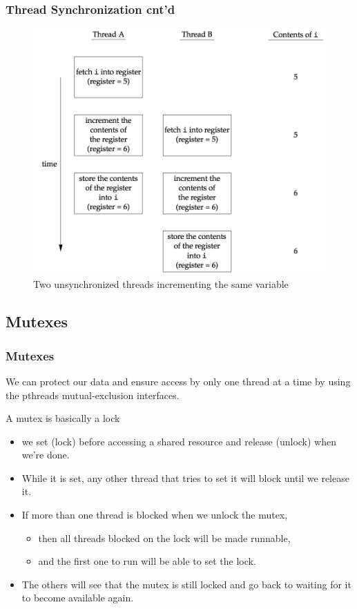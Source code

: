 \documentclass[newPxFont,sthlmFooter,nooffset]{beamer}
\begin{document}
\begin{frame}[t]
  \frametitle{Thread Synchronization cnt'd}

  \begin{figure}[h]
    \centering
    \includegraphics[width=0.7\linewidth]{figure/fig11-9}
    \caption{Two unsynchronized threads incrementing the same variable}
    \label{fig:work}
  \end{figure}


\end{frame}




\subsection{Mutexes}

\begin{frame}[t]
  \frametitle{Mutexes}
  We can protect our data and ensure access by only one thread at a time by using the pthreads mutual-exclusion interfaces.

A mutex is basically a lock
\begin{itemize}
\item we set (lock) before accessing a shared resource and release (unlock) when we’re done.
\item While it is set, any other thread that tries to set it will block until we release it.
\item If more than one thread is blocked when we unlock the mutex,
  \begin{itemize}
  \item then all threads blocked on the lock will be made runnable,
  \item and the first one to run will be able to set the lock.
  \end{itemize}
\item The others will see that the mutex is still locked and go back to waiting for it to become available again.
\end{itemize}

\end{frame}
\end{document}
